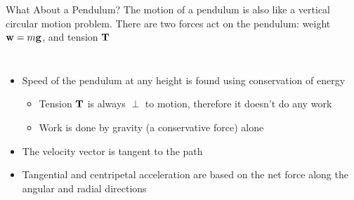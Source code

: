 \documentclass[12pt,compress,aspectratio=169]{beamer}
\newcommand{\mb}[1]{\ensuremath\mathbf{#1}}
\begin{document}
\begin{frame}{What About a Pendulum?}
  The motion of a pendulum is also like a vertical circular motion problem.
  There are two forces act on the pendulum: weight $\mb{w}=m\mb{g}$, and
  tension $\mb{T}$

  \vspace{.1in}\begin{columns}

    \begin{itemize}
    \item Speed of the pendulum at any height is found using conservation
      of energy
      \begin{itemize}
      \item Tension $\mb{T}$ is always $\perp$ to motion, therefore it doesn't
        do any work
      \item Work is done by gravity (a conservative force) alone
      \end{itemize}
    \item The velocity vector is tangent to the path
    \item Tangential and centripetal acceleration are based on the net force
      along the angular and radial directions
    \end{itemize}
  \end{columns}
\end{frame}
\end{document}
